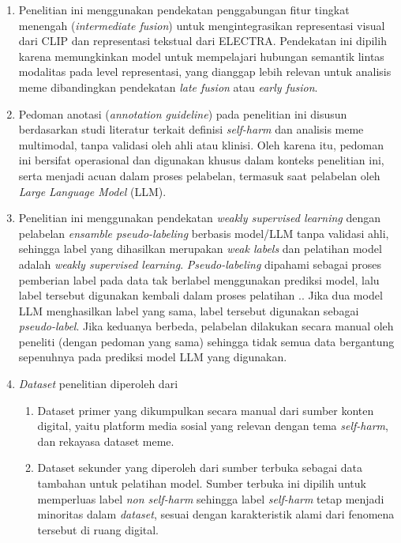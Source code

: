 \begin{enumerate}
    \item Penelitian ini menggunakan pendekatan penggabungan fitur tingkat menengah (\textit{intermediate fusion}) untuk mengintegrasikan representasi visual dari CLIP dan representasi tekstual dari ELECTRA. Pendekatan ini dipilih karena memungkinkan model untuk mempelajari hubungan semantik lintas modalitas pada level representasi, yang dianggap lebih relevan untuk analisis meme dibandingkan pendekatan \textit{late fusion} atau \textit{early fusion}.
    
    \item Pedoman anotasi (\textit{annotation guideline}) pada penelitian ini disusun berdasarkan studi literatur terkait definisi \textit{self-harm} dan analisis meme multimodal, tanpa validasi oleh ahli atau klinisi. Oleh karena itu, pedoman ini bersifat operasional dan digunakan khusus dalam konteks penelitian ini, serta menjadi acuan dalam proses pelabelan, termasuk saat pelabelan oleh \textit{Large Language Model} (LLM).
    
    \item Penelitian ini menggunakan pendekatan \textit{weakly supervised learning} dengan pelabelan \textit{ensamble pseudo-labeling} berbasis model/LLM tanpa validasi ahli, sehingga label yang dihasilkan merupakan \textit{weak labels} dan pelatihan model adalah \textit{weakly supervised learning}. \textit{{Pseudo-labeling}} dipahami sebagai proses pemberian label pada data tak berlabel menggunakan prediksi model, lalu label tersebut digunakan kembali dalam proses pelatihan \cite{lee2013pseudo}.. Jika dua model LLM menghasilkan label yang sama, label tersebut digunakan sebagai \textit{pseudo-label}. Jika keduanya berbeda, pelabelan dilakukan secara manual oleh peneliti (dengan pedoman yang sama) sehingga tidak semua data bergantung sepenuhnya pada prediksi model LLM yang digunakan. 

    \item \textit{Dataset} penelitian diperoleh dari 
    \begin{enumerate}
        \item Dataset primer yang dikumpulkan secara manual dari sumber konten digital, yaitu platform media sosial yang relevan dengan tema \textit{self-harm}, dan rekayasa dataset meme.
        \item Dataset sekunder yang diperoleh dari sumber terbuka sebagai data tambahan untuk pelatihan model. Sumber terbuka ini dipilih untuk memperluas label \textit{non self-harm} sehingga label \textit{self-harm} tetap menjadi minoritas dalam \textit{dataset}, sesuai dengan karakteristik alami dari fenomena tersebut di ruang digital.
    \end{enumerate}


\end{enumerate}
